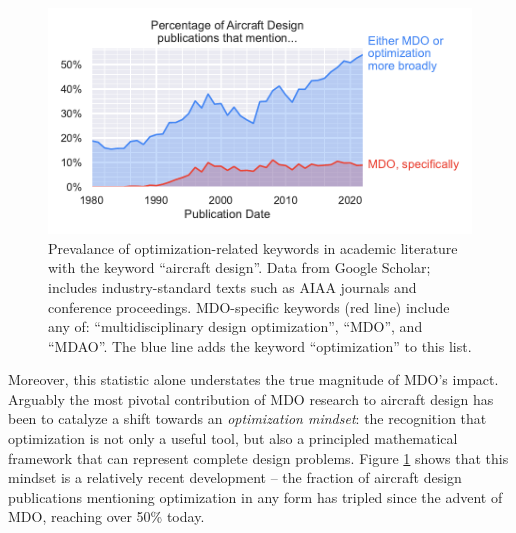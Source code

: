 \begin{figure}[h]
    \centering
    \includegraphics{../figures/mdo_citation_counts}
    \caption{Prevalance of optimization-related keywords in academic literature with the keyword ``aircraft design''. Data from Google Scholar; includes industry-standard texts such as AIAA journals and conference proceedings. MDO-specific keywords (red line) include any of: ``multidisciplinary design optimization'', ``MDO'', and ``MDAO''. The blue line adds the keyword ``optimization'' to this list.}
    \label{fig:mdo_citation_counts}
\end{figure}

Moreover, this statistic alone understates the true magnitude of MDO's impact. Arguably the most pivotal contribution of MDO research to aircraft design has been to catalyze a shift towards an \textit{optimization mindset}: the recognition that optimization is not only a useful tool, but also a principled mathematical framework that can represent complete design problems. Figure \ref{fig:mdo_citation_counts} shows that this mindset is a relatively recent development -- the fraction of aircraft design publications mentioning optimization in any form has tripled since the advent of MDO, reaching over 50\% today.

